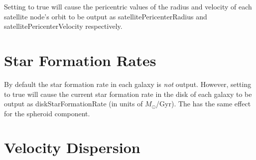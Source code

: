 Setting {\normalfont \ttfamily [outputSatellitePericenterData]} to {\normalfont \ttfamily true} will cause the pericentric values of the radius and velocity of each satellite node's orbit to be output as {\normalfont \ttfamily satellitePericenterRadius} and {\normalfont \ttfamily satellitePericenterVelocity} respectively.

\section{Star Formation Rates}

By default the star formation rate in each galaxy is \emph{not} output. However, setting {\normalfont \ttfamily [diskOutputStarFormationRate]} to true will cause the current star formation rate in the disk of each galaxy to be output as {\normalfont \ttfamily diskStarFormationRate} (in units of $M_\odot$/Gyr). The {\normalfont \ttfamily [spheroidOutputStarFormationRate]} has the same effect for the spheroid component.

\section{Velocity Dispersion}

